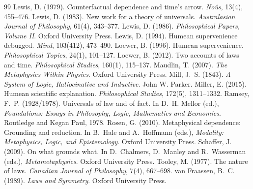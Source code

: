 \documentclass{situationist-preprint}
\begin{document}
\begin{thebibliography}{99}
 Lewis, D. (1979). Counterfactual dependence and time's arrow. \emph{No\^us}, 13(4), 455--476.
 Lewis, D. (1983). New work for a theory of universals. \emph{Australasian Journal of Philosophy}, 61(4), 343--377.
 Lewis, D. (1986). \emph{Philosophical Papers, Volume II}. Oxford University Press.
 Lewis, D. (1994). Humean supervenience debugged. \emph{Mind}, 103(412), 473--490.
 Loewer, B. (1996). Humean supervenience. \emph{Philosophical Topics}, 24(1), 101--127.
 Loewer, B. (2012). Two accounts of laws and time. \emph{Philosophical Studies}, 160(1), 115--137.
 Maudlin, T. (2007). \emph{The Metaphysics Within Physics}. Oxford University Press.
 Mill, J.~S. (1843). \emph{A System of Logic, Ratiocinative and Inductive}. John W. Parker.
 Miller, E. (2015). Humean scientific explanation. \emph{Philosophical Studies}, 172(5), 1311--1332.
 Ramsey, F.~P. (1928/1978). Universals of law and of fact. In D.~H. Mellor (ed.), \emph{Foundations: Essays in Philosophy, Logic, Mathematics and Economics}. Routledge and Kegan Paul, 1978.
 Rosen, G. (2010). Metaphysical dependence: Grounding and reduction. In B.~Hale and A.~Hoffmann (eds.), \emph{Modality: Metaphysics, Logic, and Epistemology}. Oxford University Press.
 Schaffer, J. (2009). On what grounds what. In D.~Chalmers, D.~Manley and R.~Wasserman (eds.), \emph{Metametaphysics}. Oxford University Press.
 Tooley, M. (1977). The nature of laws. \emph{Canadian Journal of Philosophy}, 7(4), 667--698.
 van Fraassen, B.~C. (1989). \emph{Laws and Symmetry}. Oxford University Press.
\end{thebibliography}
\end{document}
